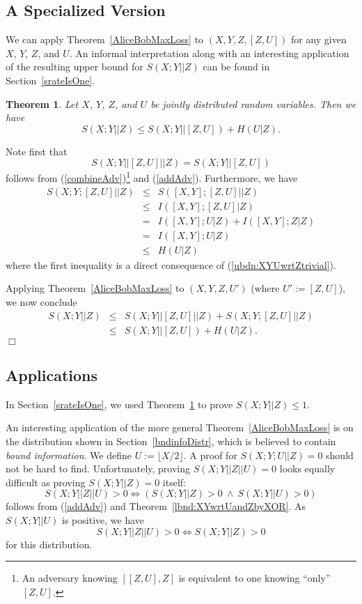 \documentclass[a4paper, twoside, openany]{report}
\newcommand{\srate}{S(X;Y||Z)}
\newcommand{\floor}[1]{\lfloor #1 \rfloor}
\theoremstyle{plain}
\newtheorem{theorem}{Theorem}
\theoremstyle{definition}
\newcommand{\proofend}{\hspace*{\fill} $\Box$\\}
\begin{document}
\subsection{A Specialized Version} \label{EveMaxGainProof}

We can apply Theorem~\ref{AliceBobMaxLoss} to $(X,Y,Z,[Z,U])$ for any given $X$, $Y$, $Z$, and $U$. An informal interpretation along with an interesting application of the resulting upper bound for $\srate$ can be found in Section~\ref{srateIsOne}.

\begin{theorem} \label{EveMaxGain}
Let $X$, $Y$, $Z$, and $U$ be jointly distributed random variables. Then we have
\[\srate \leq S(X;Y||[Z,U]) + H(U|Z).\]
\end{theorem}

\proof
Note first that
\[S(X;Y||[Z,U]||Z) = S(X;Y||[Z,U])\]
follows from (\ref{combineAdv})\footnote{An adversary knowing $[[Z,U],Z]$ is equivalent to one knowing ``only'' $[Z,U]$.} and (\ref{addAdv}). Furthermore, we have
\begin{eqnarray*}
S(X;Y;[Z,U]||Z) & \leq & S([X,Y];[Z,U]||Z) \\
                & \leq & I([X,Y];[Z,U]|Z) \\
                &  =   & I([X,Y];U|Z) + I([X,Y];Z|Z) \\
                &  =   & I([X,Y];U|Z) \\
                & \leq & H(U|Z)
\end{eqnarray*}
where the first inequality is a direct consequence of (\ref{ubdn:XYUwrtZtrivial}).

\noindent
Applying Theorem~\ref{AliceBobMaxLoss} to $(X,Y,Z,U')$ (where $U':=[Z,U]$), we now conclude
\begin{eqnarray*}
\srate & \leq & S(X;Y||[Z,U]||Z) + S(X;Y;[Z,U]||Z) \\
       & \leq & S(X;Y||[Z,U]) + H(U|Z).
\end{eqnarray*}
\proofend


\subsection{Applications}

In Section~\ref{srateIsOne}, we used Theorem~\ref{EveMaxGain} to prove $\srate \leq 1$.

An interesting application of the more general Theorem~\ref{AliceBobMaxLoss} is on the distribution shown in Section~\ref{bndinfoDistr}, which is believed to contain \emph{bound information}. We define $U := \floor{X/2}$. A proof for $S(X;Y;U||Z) = 0$ should not be hard to find. Unfortunately, proving $S(X;Y||Z||U) = 0$ looks equally difficult as proving $S(X;Y||Z) = 0$ itself:
\[S(X;Y||Z||U) > 0 \iff (S(X;Y||Z) > 0 \ \land \ S(X;Y||U) > 0)\]
follows from (\ref{addAdv}) and Theorem~\ref{lbnd:XYwrtUandZbyXOR}. As $S(X;Y||U)$ is positive, we have
\[S(X;Y||Z||U) > 0 \iff S(X;Y||Z) > 0\]
for this distribution.
\end{document}
